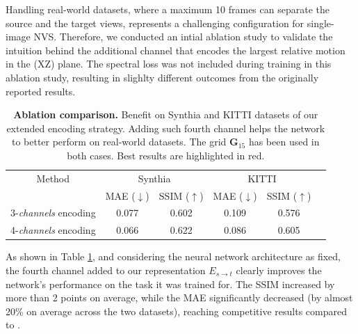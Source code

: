 Handling real-world datasets, where a maximum 10 frames can separate the source and the target views, represents a challenging configuration for single-image \ac{NVS}. Therefore, we conducted an intial ablation study to validate the intuition behind the additional channel that encodes the largest relative motion in the (XZ) plane. The spectral loss was not included during training in this ablation study, resulting in slighlty different outcomes from the originally reported results. 

\begin{table}[h!]
    \caption{\textbf{Ablation comparison.} Benefit on Synthia \citep{ros2016synthia} and KITTI \citep{geiger2012we} datasets of our extended encoding strategy. Adding such fourth channel helps the network to better perform on real-world datasets. The grid $\textbf{G}_{15}$ has been used in both cases. Best results are highlighted in \colorbox{red!25}{red}. }
    \label{tab:compExtended}
    \begin{center}%
    \begin{adjustbox}{width =.8\linewidth}
    \begin{tabular}[h]{c||ccccc}
    \hline
      Method & \multicolumn{2}{c}{Synthia} & \multicolumn{2}{c}{KITTI} \\
      &  MAE ($\downarrow$) & SSIM ($\uparrow$) & MAE ($\downarrow$) & SSIM ($\uparrow$) \\
    \hline
    3-\textit{channels} encoding & 0.077 & 0.602 & 0.109 & 0.576  \\
    4-\textit{channels} encoding & \cellcolor{red!25}0.066 & \cellcolor{red!25}0.622 & \cellcolor{red!25}0.086 & \cellcolor{red!25}0.605 \\
    \hline 
    \end{tabular}
    \end{adjustbox}
    \end{center}
    \end{table}

As shown in Table \ref{tab:compExtended}, and considering the neural network architecture as fixed, the fourth channel added to our representation $E_{s\xrightarrow{}t}$ clearly improves the network's performance on the task it was trained for. The SSIM increased by more than 2 points on average, while the \ac{MAE} significantly decreased (by almost 20\% on average across the two datasets), reaching competitive results compared to \cite{kim2020novel}. 


